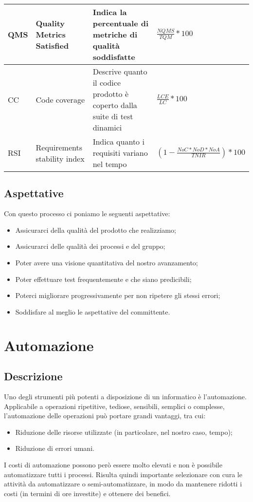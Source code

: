 \begin{itemize}
\begin{center}
\begin{tabular}{|p{1.5cm}|p{3cm}|p{4cm}|p{5cm}|}
                  \rowcolor[HTML]{C0C0C0}
                  QMS & Quality Metrics Satisfied & Indica la percentuale di metriche di qualità soddisfatte &  $\frac{NQMS}{TQM}*100$ \\ \hline
                  \rowcolor[HTML]{EFEFEF}
                  CC & Code coverage & Descrive quanto il codice prodotto è coperto dalla suite di test dinamici & $\frac{LCE}{LC}*100$  \\ \hline
                  \rowcolor[HTML]{C0C0C0}
                  RSI & Requirements stability index & Indica quanto i requisiti variano nel tempo & $(1-\frac{NoC*NoD*NoA}{TNIR})*100$   \\ \hline
                \end{tabular}
            \end{center}
            \renewcommand\arraystretch{1}
   \end{itemize}

  \subsection{Aspettative}
  Con questo processo ci poniamo le seguenti aspettative:
  \begin{itemize}
      \item Assicurarci della qualità del prodotto che realizziamo;
      \item Assicurarci delle qualità dei processi e del gruppo;
      \item Poter avere una visione quantitativa del nostro avanzamento;
      \item Poter effettuare test frequentemente e che siano predicibili;
      \item Poterci migliorare progressivamente per non ripetere gli stessi errori;
      \item Soddisfare al meglio le aspettative del committente.
  \end{itemize}

\section{Automazione}
\subsection{Descrizione}
Uno degli strumenti più potenti a disposizione di un informatico è l'automazione. Applicabile a operazioni ripetitive, tediose, sensibili, semplici o complesse, l'automazione delle operazioni può portare grandi vantaggi, tra cui:
\begin{itemize}
    \item Riduzione delle risorse utilizzate (in particolare, nel nostro caso, tempo);
    \item Riduzione di errori umani.
\end{itemize}
I costi di automazione possono però essere molto elevati e non è possibile automatizzare tutti i processi. Risulta quindi importante selezionare con cura le attività da automatizzare o semi-automatizzare, in modo da mantenere ridotti i costi (in termini di ore investite) e ottenere dei benefici.


